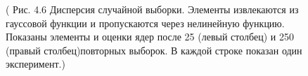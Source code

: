\documentclass[10pt,a4paper]{article}
\begin{document}
\begin{figure}[H]
	\caption{ (  Рис. 4.6 Дисперсия случайной выборки. Элементы извлекаются из гауссовой функции и пропускаются через нелинейную функцию. Показаны элементы и оценки ядер после 25 (левый столбец) и 250 (правый столбец)повторных выборок. В каждой строке показан один эксперимент.)}
	\label{fig:46orig}
\end{figure}
\end{document}
